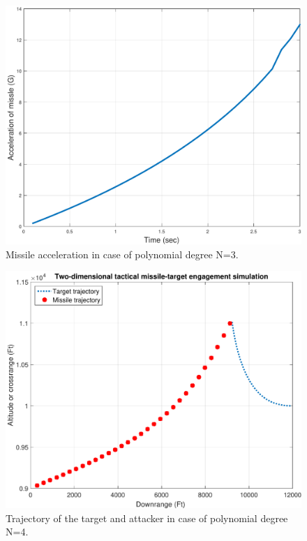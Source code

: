 \begin{figure}[htb]
	\centering
	\includegraphics[scale = 0.75]{fig/MissileAccelerationP3.pdf}
	\caption{Missile acceleration in case of polynomial degree N=3.}
	\label{missile accelerationP3}
\end{figure}


\begin{figure}[htb]
	\centering
	\includegraphics[scale = 0.75]{fig/trajectoryP4.pdf}
	\caption{Trajectory of the target and attacker in case of polynomial degree N=4.}
	\label{trajectoryP4}
\end{figure}


